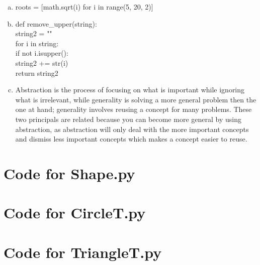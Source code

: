 \documentclass[12pt]{article}
\begin{document}
\begin{enumerate}[a)]
\item	
roots = [math.sqrt(i) for i in range(5, 20, 2)]

\item
def remove\_upper(string): \\
\hspace*{0.5cm} string2 = "" \\
\hspace*{0.5cm} for i in string: \\
\hspace*{1cm} if not i.isupper(): \\
\hspace*{1.5cm} string2 += str(i) \\
\hspace*{0.5cm} return string2 

\item
Abstraction is the process of focusing on what is important while ignoring what is irrelevant, while generality is solving a more general problem then the one at hand; generality involves reusing a concept for many problems. These two principals are related because you can become more general by using abstraction, as abstraction will only deal with the more important concepts and dismiss less important concepts which makes a concept easier to reuse. 

\end{enumerate}

\newpage

\lstset{language=Python, basicstyle=\tiny, breaklines=true, showspaces=false,
  showstringspaces=false, breakatwhitespace=true}

\def\thesection{\Alph{section}}

\section{Code for Shape.py}

\noindent 

\newpage

\section{Code for CircleT.py}

\noindent 

\newpage

\section{Code for TriangleT.py}
\end{document}
